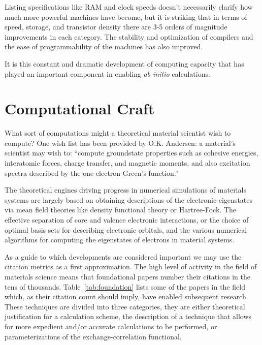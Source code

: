 Listing specifications like RAM and clock speeds doesn't necessarily clarify 
how much more powerful machines have become, 
but it is striking that in terms of speed, storage, and transistor density 
there are 3-5 orders of magnitude improvements in each category. 
The stability and optimization of compilers and the ease of programmability
of the machines has also improved.

It is this constant and dramatic development of computing capacity that 
has played an important component in enabling {\it ab initio} calculations. 

\section{Computational Craft}
What sort of computations might a theoretical material scientist
wish to compute? One wish list has been provided by O.K. Andersen:
a material's scientist may wish to:
``compute groundstate properties such as cohesive energies, interatomic forces, 
charge transfer, and magnetic moments, and also excitation spectra described 
by the one-electron Green's function."\cite{anderson75} 

The theoretical engines driving progress in numerical simulations of materials systems are
largely based on obtaining descriptions of the electronic eigenstates via mean field theories
like density functional theory or Hartree-Fock. The effective separation
of core and valence electronic interactions, or the choice of optimal basis sets for
describing electronic orbitals, and the various numerical algorithms for 
computing the eigenstates of electrons in material systems.

As a guide to which developments are considered important we may
use the citation metrics as a first approximation. The high level of activity in the field of materials science 
means that foundational papers number their citations in the tens of thousands. 
Table~\ref{tab:foundation} lists some of the papers in the field which, as
their citation count should imply, have enabled subsequent research. These techniques are divided into
three categories, they are either theoretical justification for a calculation scheme, the description of
a technique that allows for more expedient and/or accurate calculations to be performed, 
or parameterizations of the exchange-correlation functional.

